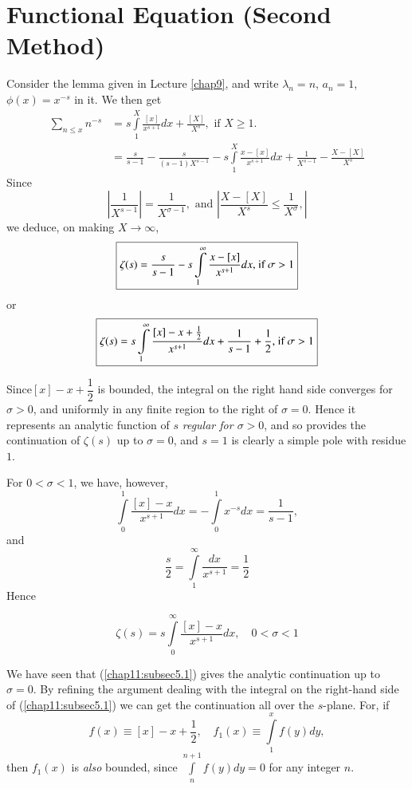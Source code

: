 \section[Functional Equation (Second Method)]{Functional Equation (Second Method) \cite[p.13]{key16}}\label{chap11:sec5}
Consider the lemma given in Lecture \ref{chap9}, and write $\lambda_n =n$, $a_n
=1$, $\phi(x) = x^{-s}$ in it. We then get
\begin{align*}
\sum\limits_{n \leq x} n^{-s} & = s \int\limits^X_1 \frac{[x]}{x^{s+1}}
dx + \frac{[X]}{X^s} , \text{ if } X \geq 1.\\
& = \frac{s}{s-1} -\frac{s}{(s-1)X^{s-1}}  - s \int\limits^X_1
\frac{x-[x]}{x^{s+1}} dx + \frac{1}{X^{s-1}} - \frac{X-[X]}{X^s}
\end{align*}
Since
$$
\left|\frac{1}{X^{s-1}} \right| = \frac{1}{X^{\sigma-1}} , \text{ and } \left|
\frac{X-[X]}{X^s} \leq \frac{1}{X^\sigma},
\right|
$$
we deduce, on making $X \to \infty$,
$$
\text{\fbox{$\zeta(s) = \frac{s}{s-1} - s \int\limits^\infty_1
    \frac{x-[x]}{x^{s+1}} dx, $ if $\sigma > 1$}}
$$
or
\begin{equation}
\text{\fbox{$\zeta(s) = s \int\limits^\infty_1
    \frac{[x]-x+\frac{1}{2}}{x^{s+1}} dx + \frac{1}{s-1} +
    \frac{1}{2}$, if $\sigma > 1$}}\label{chap11:subsec5.1}
\end{equation}

 Since\pageoriginale $[x] - x + \dfrac{1}{2}$ is bounded, the
integral on the right hand side converges for $\sigma >0$, and
uniformly in any finite region to the right of $\sigma =0$. Hence it
represents an analytic function of $s$ \textit{regular for $\sigma
  >0$}, and so provides the continuation of $\zeta(s)$ up to $\sigma
=0$, and $s=1$ is clearly a simple pole with residue $1$.

For $0 < \sigma < 1$, we have, however, 
$$
\int\limits^1_0 \frac{[x] -x}{x^{s+1}} dx = - \int\limits^1_0 x^{-s}
dx = \frac{1}{s-1}, 
$$
and 
$$
\frac{s}{2} = \int\limits^\infty_1 \frac{dx}{x^{s+1}} = \frac{1}{2} 
$$
Hence

\begin{equation}
\zeta(s) = s \int\limits^\infty_0 \frac{[x] - x}{x^{s+1}} dx, \quad 0
<  \sigma < 1\label{chap11:subsec5.2}
\end{equation}

We have seen that (\ref{chap11:subsec5.1}) gives the analytic continuation up to $\sigma 
=0$. By refining the argument dealing with the integral on the
right-hand side of (\ref{chap11:subsec5.1}) we can get the continuation all over the
$s$-plane. For, if 
$$
f(x) \equiv [x] - x + \frac{1}{2} , \quad f_1 (x) \equiv
\int\limits^x_1 f(y) dy,
$$
then $f_1(x)$ is \textit{also} bounded, since  $\int\limits^{n+1}_n
  f(y) dy =0$ for any integer $n$.


